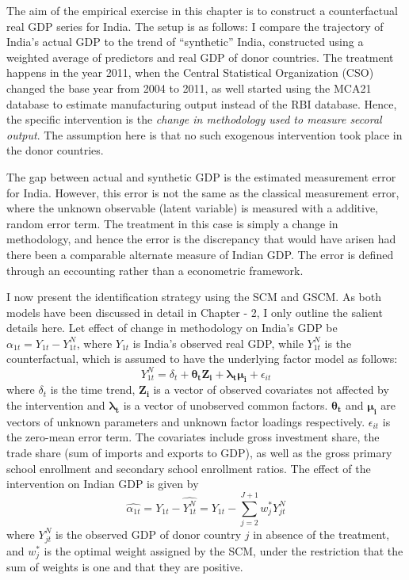 \documentclass[12pt,nobind, a4paper]{reedthesis}
\begin{document}
 The aim of the empirical exercise in this chapter is to construct a counterfactual real GDP series for India. The setup is as follows: I compare the trajectory of India's actual GDP to the trend of ``synthetic'' India, constructed using a weighted average of predictors and real GDP of donor countries. The treatment happens in the year 2011, when the Central Statistical Organization (CSO) changed the base year from 2004 to 2011, as well started using the MCA21 database to estimate manufacturing output instead of the RBI database. Hence, the specific intervention is the \emph{change in methodology used to measure secoral output}. The assumption here is that no such exogenous intervention took place in the donor countries.
 \linebreak

 The gap between actual and synthetic GDP is the estimated measurement error for India. However, this error is not the same as the classical measurement error, where the unknown observable (latent variable) is measured with a additive, random error term. The treatment in this case is simply a change in methodology, and hence the error is the discrepancy that would have arisen had there been a comparable alternate measure of Indian GDP. The error is defined through an eccounting rather than a econometric framework.
 \linebreak

 I now present the identification strategy using the SCM and GSCM. As both models have been discussed in detail in Chapter - 2, I only outline the salient details here. Let effect of change in methodology on India's GDP be \(\alpha_{1t}= Y_{1t}-Y^{N}_{1t}\), where \(Y_{1t}\) is India's observed real GDP, while \(Y^{N}_{1t}\) is the counterfactual, which is assumed to have the underlying factor model as follows:
 \begin{equation}
 Y^{N}_{1t}= \delta_{t}+\mathbf{\theta_{t} Z_{i}}+\mathbf{\lambda_{t} \mu_{i}}+ \epsilon_{it}
 \label{eq:eq99}
 \end{equation}
 where \(\delta_{t}\) is the time trend, \(\mathbf{Z_{i}}\) is a vector of observed covariates not affected by the intervention and \(\mathbf{ \lambda_{t}}\) is a vector of unobserved common factors. \(\mathbf{\theta_{t}}\) and \(\mathbf{\mu_{i}}\) are vectors of unknown parameters and unknown factor loadings respectively. \(\epsilon_{it}\) is the zero-mean error term. The covariates include gross investment share, the trade share (sum of imports and exports to GDP), as well as the gross primary school enrollment and secondary school enrollment ratios. The effect of the intervention on Indian GDP is given by
 \begin{equation}
 \hat{\alpha_{1t}}={Y_{1t}}-\hat{Y^{N}_{1t}}={Y_{1t}}-\sum_{j=2}^{J+1}w^{*}_{j}Y^{N}_{jt}
 \label{eq:eq88}
 \end{equation}
 where \(Y^{N}_{jt}\) is the observed GDP of donor country \(j\) in absence of the treatment, and \(w^{*}_{j}\) is the optimal weight assigned by the SCM, under the restriction that the sum of weights is one and that they are positive.
 \linebreak
\end{document}
